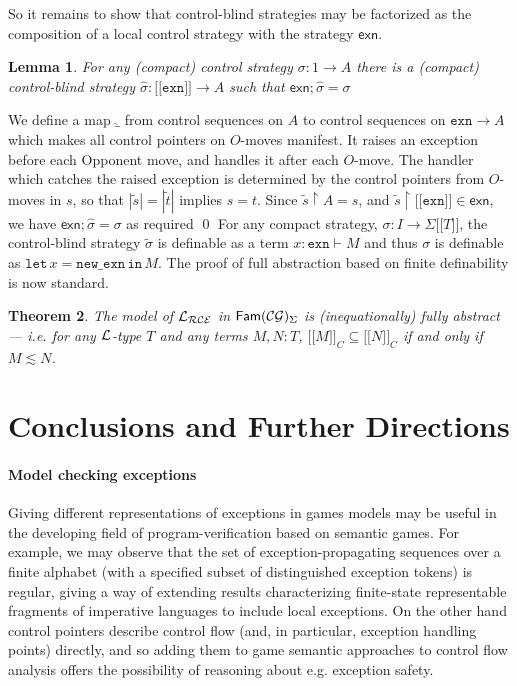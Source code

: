 \documentclass{eptcs}
\def\[{\ensuremath{[ \! [}}
\def\]{\ensuremath{] \! ]}}
\def\L{{\cal{L}}}
\def\1m{\iota}
\def\restrict{\!\! \upharpoonright \!\!}
\def\1{1}
\def\restrict{\!\! \upharpoonright \!\!}
\newcommand{\CG}{{\cal{CG}}}
\newcommand{\lett}{{\mathtt{let}}}
\newcommand{\spc}{\hspace{2pt}}
\newcommand{\Lce}{{\cal{L_{RCE}}}}
\newcommand{\nxn}{{\mathtt{new\_exn}}}
\newcommand{\xcell}{{\mathsf{exn}}}
\newcommand{\Fam}{{\mathsf{Fam}}}
\newcommand{\exn}{{\mathtt{exn}}}
\newcommand{\inn}{{{\mathtt{in}}}}
\newtheorem{theorem}{Theorem}[section]
\newtheorem{lemma}[theorem]{Lemma}
\newif\ifqed
\newcommand{\qed}{\global\qedfalse\noindent\unskip\penalty50\null\nobreak\hskip1em\nobreak\hfill$\Box$}
\let\Box\undefined
\newenvironment{proof}[1][Proof]{\global\qedtrue\trivlist\item[\hskip\labelsep\textsc{#1:}]}{\ifqed\qed\fi\endtrivlist}
\begin{document}
{\begin{proof}
\end{proof}
So it remains to show that control-blind strategies may be factorized as the composition of a local control strategy with the strategy $\xcell$. 
\begin{lemma}For any (compact) control strategy $\sigma:\1 \rightarrow A$ there is a (compact) control-blind strategy $\widehat{\sigma}: \[\exn\] \rightarrow A$ such that  $\xcell;\widehat{\sigma} = \sigma$
\end{lemma}
\begin{proof}
We define a map $\widehat{\_}$ from control sequences on $A$ to control sequences on $\exn \rightarrow A$ which makes all control pointers on $O$-moves manifest. It raises an exception before each Opponent move, and handles it  after each $O$-move. The handler which catches the raised exception is determined by the control pointers from $O$-moves in $s$, so that  $|\widetilde{s}| = |\widetilde{t}|$ implies  $s = t$. Since  $\widetilde{s} \restrict A = s$, and   $\widetilde{s} \restrict \[\exn\] \in \xcell$, we have  $\xcell;\widehat{\sigma} = \sigma$ as required
\end{proof}
For any compact strategy, $\sigma:I \rightarrow \Sigma\[T\]$, the control-blind strategy $\widetilde{\sigma}$ is definable as a term  $x:\exn \vdash M$ and thus $\sigma$ is definable as $\lett \spc x= \nxn\spc \inn\spc M$. The proof of full abstraction based on finite definability is now standard. 



\begin{theorem}The model of $\Lce$ in $\Fam(\CG)_{\Sigma}$ is (inequationally) fully abstract --- i.e. for any $\L$-type $T$ and any terms $M,N:T$, $\[M\]_C \subseteq  \[N\]_C$ if and only if $M \lesssim N$.
\end{theorem}





\section{Conclusions and Further Directions}
\paragraph{Model checking exceptions}
Giving different representations of exceptions in games models may be useful in the developing field of program-verification based on semantic games. For example, we may observe that the set of exception-propagating sequences over a finite alphabet (with a specified subset of distinguished exception tokens) is regular, giving a way of extending results characterizing finite-state representable fragments of imperative languages to include local exceptions. On the other hand control pointers describe control flow (and, in particular,  exception handling points) directly, and so adding them to  game semantic approaches to control flow analysis \cite{MH} offers the possibility of reasoning about e.g. exception safety.
}
\end{document}
